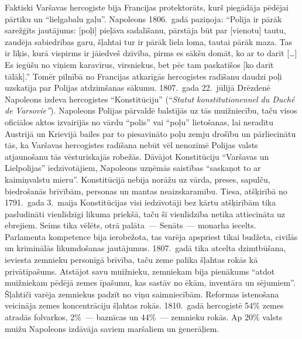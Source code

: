 \documentclass[twoside,a5paper,12pt,fleqn,openany]{extbook}
\newcommand{\frtxti}[1]{\textit{\textfrench{#1}}}
\newcommand{\citespace}{[\dots{}]}
\begin{document}
Faktiski Varšavas hercogiste bija Francijas protektorāts, kurš piegādāja pēdējai pārtiku un ``lielgabalu gaļu''. Napoleons 1806.~gadā paziņoja: ``Polija ir pārāk sarežģīts jautājums: [poļi] pieļāva sadalīšanu, pārstāja būt par [vienotu] tautu, zaudēja sabiedrības garu, šļahtai tur ir pārāk liela loma, tautai pārāk maza. Tas ir līķis, kurā vispirms ir jāiedveš dzīvība, pirms es sākšu domāt, ko ar to darīt \citespace{} Es iegūšu no viņiem karavīrus, virsniekus, bet pēc tam paskatīšos [ko darīt tālāk].'' Tomēr pilnībā no Francijas atkarīgās hercogistes radīšanu daudzi poļi uzskatīja par Polijas atdzimšanas sākumu. 1807.~gada 22.~jūlijā Drēzdenē Napoleons izdeva hercogistes ``Konstitūciju'' (``\frtxti{Statut konstitutionennel du Duché de Varsovie''}). Napoleons Polijas pārvaldē balstījās uz tās muižniecību, taču visos oficiālos aktos izvairījās no vārdu ``polis'' vai ``poļu'' lietošanas, lai neradītu Austrijā un Krievijā bailes par to piesavināto poļu zemju drošību un pārliecinātu tās, ka Varšavas hercogistes radīšana nebūt vēl nenozīmē Polijas valsts atjaunošanu tās vēsturiskajās robežās. Dāvājot Konstitūciju ``Varšavas un Lielpolijas'' iedzīvotājiem, Napoleons uzņēmās saistības ``saskaņot to ar kaimiņvalstu mieru''. Konstitūcijā nebija norāžu uz vārda, preses, sapulču, biedrošanās brīvībām, personas un mantas neaizskaramību. Tiesa, atšķirībā no 1791.~gada 3.~maija Konstitūcijas visi iedzīvotāji bez kārtu atšķirībām tika pasludināti vienlīdzīgi likuma priekšā, taču šī vienlīdzība netika attiecināta uz ebrejiem. Seims tika vēlēts, otrā palāta~--- Senāts~--- monarha iecelts. Parlamenta kompetence bija ierobežota, tas varēja apspriest tikai budžeta, civilās un kriminālās likumdošanas jautājumus. 1807.~gadā tika atcelta dzimtbūšana, ieviesta zemnieku personīgā brīvība, taču zeme palika šļahtas rokās kā privātīpašums. Atstājot savu muižnieku, zemniekam bija pienākums ``atdot muižniekam pēdējā zemes īpašumu, kas sastāv no ēkām, inventāra un sējumiem''. Šļahtiči varēja zemniekus padzīt no viņu saimniecībām. Reformas īstenošana veicināja zemes koncentrāciju šļahtas rokās. 1810.~gadā hercogistē 54\% zemes atradās folvarkos, 2\%~--- baznīcas un 44\%~--- zemnieku rokās. Ap 20\% valsts muižu Napoleons izdāvāja saviem maršaliem un ģenerāļiem.
\end{document}
